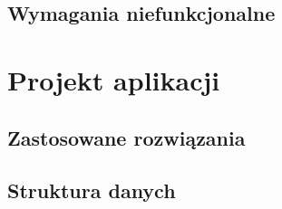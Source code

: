 \documentclass[eng,printmode]{mgr}
\begin{document}
\section{Wymagania niefunkcjonalne}
\chapter{Projekt aplikacji}
\section{Zastosowane rozwiązania}
\section{Struktura danych}

\end{document}
